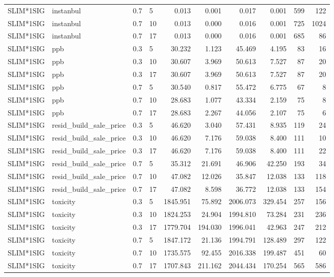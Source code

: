 \begin{longtable}{llllrrrrrr}
SLIM*1SIG & instanbul & 0.7 & 5 & 0.013 & 0.001 & 0.017 & 0.001 & 599 & 122 \\
SLIM*1SIG & instanbul & 0.7 & 10 & 0.013 & 0.000 & 0.016 & 0.001 & 725 & 1024 \\
SLIM*1SIG & instanbul & 0.7 & 17 & 0.013 & 0.000 & 0.016 & 0.001 & 685 & 86 \\
\midrule
SLIM*1SIG & ppb & 0.3 & 5 & 30.232 & 1.123 & 45.469 & 4.195 & 83 & 16 \\
SLIM*1SIG & ppb & 0.3 & 10 & 30.607 & 3.969 & 50.613 & 7.527 & 87 & 20 \\
SLIM*1SIG & ppb & 0.3 & 17 & 30.607 & 3.969 & 50.613 & 7.527 & 87 & 20 \\
SLIM*1SIG & ppb & 0.7 & 5 & 30.540 & 0.817 & 55.472 & 6.775 & 67 & 8 \\
SLIM*1SIG & ppb & 0.7 & 10 & 28.683 & 1.077 & 43.334 & 2.159 & 75 & 8 \\
SLIM*1SIG & ppb & 0.7 & 17 & 28.683 & 2.267 & 44.056 & 2.107 & 75 & 6 \\
\midrule
SLIM*1SIG & resid_build_sale_price & 0.3 & 5 & 46.620 & 3.040 & 57.431 & 8.935 & 119 & 24 \\
SLIM*1SIG & resid_build_sale_price & 0.3 & 10 & 46.620 & 7.176 & 59.038 & 8.400 & 111 & 10 \\
SLIM*1SIG & resid_build_sale_price & 0.3 & 17 & 46.620 & 7.176 & 59.038 & 8.400 & 111 & 22 \\
SLIM*1SIG & resid_build_sale_price & 0.7 & 5 & 35.312 & 21.691 & 46.906 & 42.250 & 193 & 34 \\
SLIM*1SIG & resid_build_sale_price & 0.7 & 10 & 47.082 & 12.026 & 35.847 & 12.038 & 133 & 118 \\
SLIM*1SIG & resid_build_sale_price & 0.7 & 17 & 47.082 & 8.598 & 36.772 & 12.038 & 133 & 154 \\
\midrule
SLIM*1SIG & toxicity & 0.3 & 5 & 1845.951 & 75.892 & 2006.073 & 329.454 & 257 & 156 \\
SLIM*1SIG & toxicity & 0.3 & 10 & 1824.253 & 24.904 & 1994.810 & 73.284 & 231 & 236 \\
SLIM*1SIG & toxicity & 0.3 & 17 & 1779.704 & 194.030 & 1996.041 & 42.963 & 247 & 212 \\
SLIM*1SIG & toxicity & 0.7 & 5 & 1847.172 & 21.136 & 1994.791 & 128.489 & 297 & 122 \\
SLIM*1SIG & toxicity & 0.7 & 10 & 1735.575 & 92.455 & 2016.338 & 199.487 & 451 & 60 \\
SLIM*1SIG & toxicity & 0.7 & 17 & 1707.843 & 211.162 & 2044.434 & 170.254 & 565 & 586 \\

\end{longtable}
